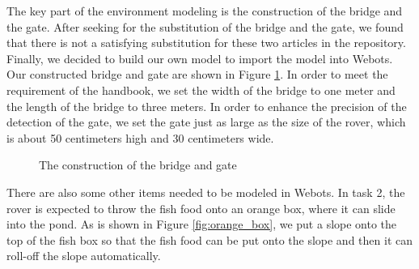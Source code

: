 The key part of the environment modeling is the construction of the bridge and the gate. After seeking for the substitution of the bridge and the gate, we found that there is not a satisfying substitution for these two articles in the repository. Finally, we decided to build our own model to import the model into Webots. Our constructed bridge and gate are shown in Figure \ref{fig:bridge_and_gate}. In order to meet the requirement of the handbook, we set the width of the bridge to one meter and the length of the bridge to three meters. In order to enhance the precision of the detection of the gate, we set the gate just as large as the size of the rover, which is about 50 centimeters high and 30 centimeters wide. 

\begin{figure}[htbp]
    \centering
    \caption{The construction of the bridge and gate}
    \label{fig:bridge_and_gate}
\end{figure}

There are also some other items needed to be modeled in Webots. In task 2, the rover is expected to throw the fish food onto an orange box, where it can slide into the pond. As is shown in Figure \ref{fig:orange_box}, we put a slope onto the top of the fish box so that the fish food can be put onto the slope and then it can roll-off the slope automatically.


